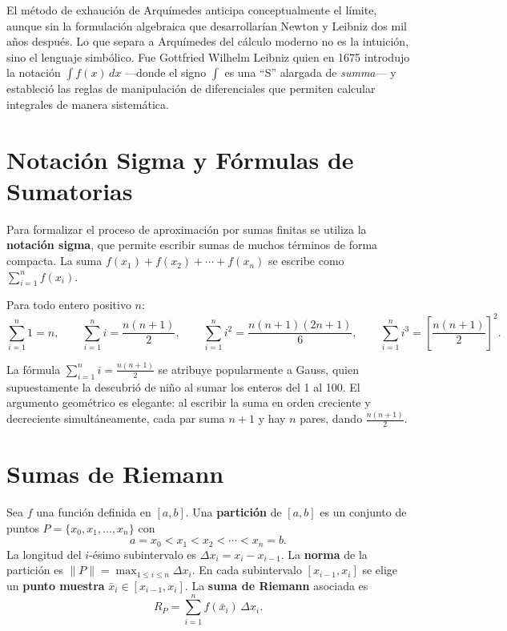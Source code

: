 \begin{rem}
El método de exhaución de Arquímedes anticipa conceptualmente el límite, aunque sin la formulación algebraica que desarrollarían Newton y Leibniz dos mil años después. Lo que separa a Arquímedes del cálculo moderno no es la intuición, sino el lenguaje simbólico. Fue Gottfried Wilhelm Leibniz quien en 1675 introdujo la notación $\int f(x)\,dx$ ---donde el signo $\int$ es una ``S'' alargada de \emph{summa}--- y estableció las reglas de manipulación de diferenciales que permiten calcular integrales de manera sistemática.
\end{rem}

\section{Notación Sigma y Fórmulas de Sumatorias}

Para formalizar el proceso de aproximación por sumas finitas se utiliza la \textbf{notación sigma}, que permite escribir sumas de muchos términos de forma compacta. La suma $f(x_1) + f(x_2) + \cdots + f(x_n)$ se escribe como $\sum_{i=1}^{n} f(x_i)$.

\begin{theorem}
Para todo entero positivo $n$:
\[
\sum_{i=1}^{n} 1 = n, \qquad
\sum_{i=1}^{n} i = \frac{n(n+1)}{2}, \qquad
\sum_{i=1}^{n} i^2 = \frac{n(n+1)(2n+1)}{6}, \qquad
\sum_{i=1}^{n} i^3 = \left[\frac{n(n+1)}{2}\right]^2.
\]
\end{theorem}

\begin{rem}
La fórmula $\sum_{i=1}^n i = \frac{n(n+1)}{2}$ se atribuye popularmente a Gauss, quien supuestamente la descubrió de niño al sumar los enteros del 1 al 100. El argumento geométrico es elegante: al escribir la suma en orden creciente y decreciente simultáneamente, cada par suma $n+1$ y hay $n$ pares, dando $\frac{n(n+1)}{2}$.
\end{rem}

\section{Sumas de Riemann}

\begin{definition}
Sea $f$ una función definida en $[a,b]$. Una \textbf{partición} de $[a,b]$ es un conjunto de puntos $P = \{x_0, x_1, \ldots, x_n\}$ con
\[
a = x_0 < x_1 < x_2 < \cdots < x_n = b.
\]
La longitud del $i$-ésimo subintervalo es $\Delta x_i = x_i - x_{i-1}$. La \textbf{norma} de la partición es $\|P\| = \max_{1\leq i \leq n} \Delta x_i$. En cada subintervalo $[x_{i-1}, x_i]$ se elige un \textbf{punto muestra} $\bar{x}_i \in [x_{i-1}, x_i]$. La \textbf{suma de Riemann} asociada es
\[
R_P = \sum_{i=1}^{n} f(\bar{x}_i)\,\Delta x_i.
\]
\end{definition}

